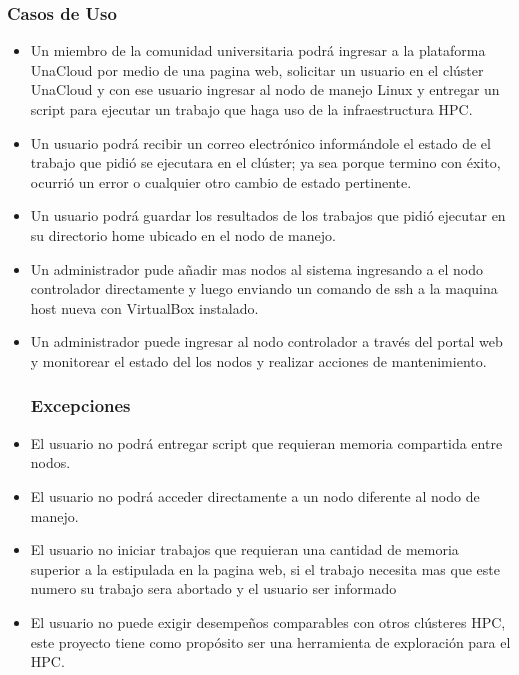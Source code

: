 \subsubsection{Casos de Uso}
\begin{itemize}
    \item Un miembro de la comunidad universitaria podrá ingresar a la plataforma UnaCloud por medio de una pagina web, solicitar un usuario en el clúster UnaCloud y con ese usuario ingresar al nodo de manejo Linux y entregar un script para ejecutar un trabajo que haga uso de la infraestructura HPC.
    \item Un usuario podrá recibir un correo electrónico informándole el estado de el trabajo que pidió se ejecutara en el clúster; ya sea porque termino con éxito, ocurrió un error o cualquier otro cambio de estado pertinente.
    \item Un usuario podrá guardar los resultados de los trabajos que pidió ejecutar en su directorio home ubicado en el nodo de manejo.
    \item Un administrador pude añadir mas nodos al sistema ingresando a el nodo controlador directamente y luego enviando un comando de ssh a la maquina host nueva con VirtualBox instalado.
    \item Un administrador puede ingresar al nodo controlador a través del portal web y monitorear el estado del los nodos y realizar acciones de mantenimiento.
\subsubsection{Excepciones}
    \item El usuario no podrá entregar script que requieran memoria compartida entre nodos.
    \item El usuario no podrá acceder directamente a un nodo diferente al nodo de manejo.
    \item El usuario no iniciar trabajos que requieran una cantidad de memoria superior a la estipulada en la pagina web, si el trabajo necesita mas que este numero su trabajo sera abortado y el usuario ser informado
    \item El usuario no puede exigir desempeños comparables con otros clústeres HPC, este proyecto tiene como propósito ser una herramienta de exploración para el HPC.
\end{itemize}
